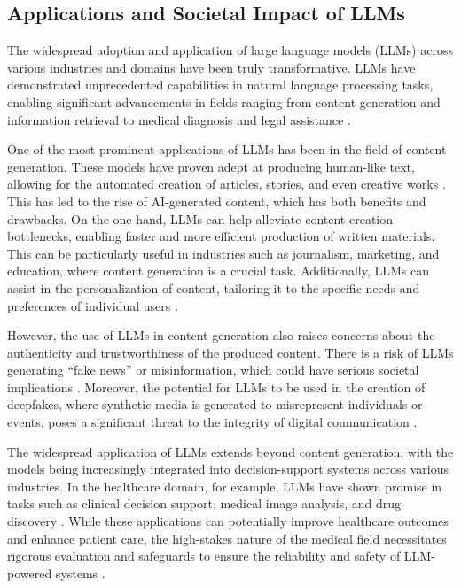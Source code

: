 \documentclass[11pt]{article}
\begin{document}
\subsection{Applications and Societal Impact of LLMs}

The widespread adoption and application of large language models (LLMs) across various industries and domains have been truly transformative. LLMs have demonstrated unprecedented capabilities in natural language processing tasks, enabling significant advancements in fields ranging from content generation and information retrieval to medical diagnosis and legal assistance \cite{ref28,ref29}.

One of the most prominent applications of LLMs has been in the field of content generation. These models have proven adept at producing human-like text, allowing for the automated creation of articles, stories, and even creative works \cite{ref22}. This has led to the rise of AI-generated content, which has both benefits and drawbacks. On the one hand, LLMs can help alleviate content creation bottlenecks, enabling faster and more efficient production of written materials. This can be particularly useful in industries such as journalism, marketing, and education, where content generation is a crucial task. Additionally, LLMs can assist in the personalization of content, tailoring it to the specific needs and preferences of individual users \cite{ref30}.

However, the use of LLMs in content generation also raises concerns about the authenticity and trustworthiness of the produced content. There is a risk of LLMs generating ``fake news'' or misinformation, which could have serious societal implications \cite{ref31}. Moreover, the potential for LLMs to be used in the creation of deepfakes, where synthetic media is generated to misrepresent individuals or events, poses a significant threat to the integrity of digital communication \cite{ref32}.

The widespread application of LLMs extends beyond content generation, with the models being increasingly integrated into decision-support systems across various industries. In the healthcare domain, for example, LLMs have shown promise in tasks such as clinical decision support, medical image analysis, and drug discovery \cite{ref33,ref34}. While these applications can potentially improve healthcare outcomes and enhance patient care, the high-stakes nature of the medical field necessitates rigorous evaluation and safeguards to ensure the reliability and safety of LLM-powered systems \cite{ref35}.
\end{document}
